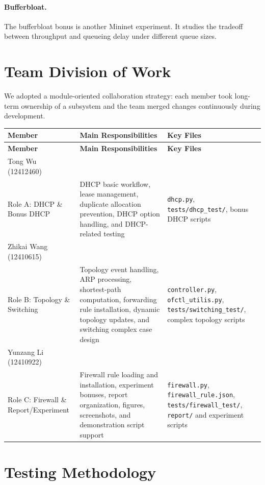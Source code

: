 \documentclass[11pt,a4paper]{article}
\begin{document}
\paragraph{Bufferbloat.}
The bufferbloat bonus is another Mininet experiment. It studies the tradeoff between
throughput and queueing delay under different queue sizes.

\section{Team Division of Work}

We adopted a module-oriented collaboration strategy: each member took long-term ownership
of a subsystem and the team merged changes continuously during development.

\begin{longtable}{>{\raggedright\arraybackslash}p{} >{\raggedright\arraybackslash}p{} >{\raggedright\arraybackslash}p{}}
\toprule
\textbf{Member} & \textbf{Main Responsibilities} & \textbf{Key Files} \\
\midrule
\endfirsthead
\toprule
\textbf{Member} & \textbf{Main Responsibilities} & \textbf{Key Files} \\
\midrule
\endhead
Tong Wu (12412460)\\Role A: DHCP \& Bonus DHCP &
DHCP basic workflow, lease management, duplicate allocation prevention, DHCP option
handling, and DHCP-related testing &
\texttt{dhcp.py}, \texttt{tests/dhcp\_test/}, bonus DHCP scripts \\
\midrule
Zhikai Wang (12410615)\\Role B: Topology \& Switching &
Topology event handling, ARP processing, shortest-path computation, forwarding rule
installation, dynamic topology updates, and switching complex case design &
\texttt{controller.py}, \texttt{ofctl\_utilis.py}, \texttt{tests/switching\_test/},
complex topology scripts \\
\midrule
Yunzang Li (12410922)\\Role C: Firewall \& Report/Experiment &
Firewall rule loading and installation, experiment bonuses, report organization, figures,
screenshots, and demonstration script support &
\texttt{firewall.py}, \texttt{firewall\_rule.json}, \texttt{tests/firewall\_test/},
\texttt{report/} and experiment scripts \\
\bottomrule
\end{longtable}

\section{Testing Methodology}
\end{document}
